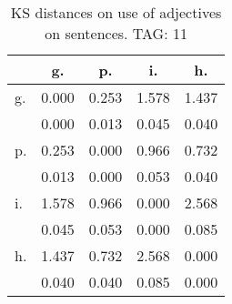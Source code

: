\begin{table}[h!]
\begin{center}
\begin{tabular}{| l | c | c | c | c |}\hline
 & g. & p. & i. & h. \\\hline
g. & 0.000  & 0.253  & 1.578  & 1.437 \\\hline
 & 0.000  & 0.013  & 0.045  & 0.040 \\\hline
p. & 0.253  & 0.000  & 0.966  & 0.732 \\\hline
 & 0.013  & 0.000  & 0.053  & 0.040 \\\hline
i. & 1.578  & 0.966  & 0.000  & 2.568 \\\hline
 & 0.045  & 0.053  & 0.000  & 0.085 \\\hline
h. & 1.437  & 0.732  & 2.568  & 0.000 \\\hline
 & 0.040  & 0.040  & 0.085  & 0.000 \\\hline
\end{tabular}
\caption{KS distances on use of adjectives on sentences. TAG: 11}
\end{center}
\end{table}